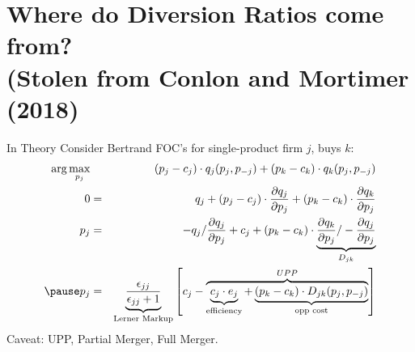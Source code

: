 \documentclass[xcolor=pdftex,dvipsnames,table,mathserif,aspectratio=169]{beamer}
\begin{document}

\section{Where do Diversion Ratios come from?\\ (Stolen from Conlon and Mortimer (2018)}
\begin{frame}{In Theory}
Consider Bertrand FOC's for single-product firm $j$, buys $k$:
\begin{eqnarray*}
\arg \max_{p_j}&&\, (p_j-c_j) \cdot q_j(p_j,p_{-j}) + (p_k-c_k) \cdot q_k(p_j,p_{-j})\\
0 &=&q_j+ (p_j-c_j) \cdot \frac{\partial q_j}{\partial p_j}+ (p_k-c_k) \cdot  \frac{\partial q_k}{\partial p_j}\\
p_j &=&-q_j/\frac{\partial q_j}{\partial p_j}+ c_j + (p_k-c_k) \cdot  \underbrace{\frac{\partial q_k}{\partial p_j}/-\frac{\partial q_j}{\partial p_j}}_{D_{jk}}\\ \pause
p_j &=& \underbrace{\frac{\epsilon_{jj}}{\epsilon_{jj}+1}}_{\text{Lerner Markup}} \left[  c_j -\overbrace{ \underbrace{c_j \cdot e_j}_{\text{efficiency}} + \underbrace{(p_k-c_k) \cdot  D_{jk} (p_j,p_{-j})}_{\text{opp cost}}}^{UPP} \right]\\
\end{eqnarray*}
Caveat: UPP, Partial Merger, Full Merger.
\end{frame}
\end{document}
